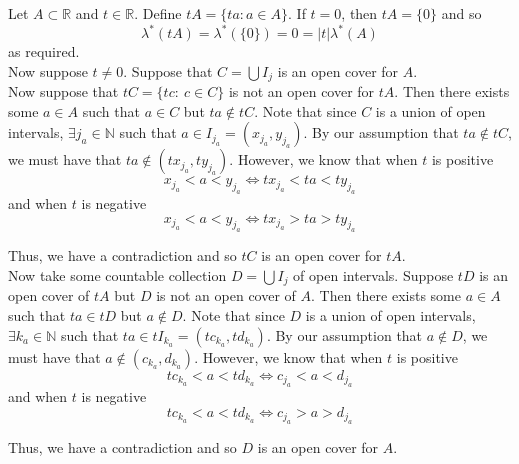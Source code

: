 \documentclass[12pt]{article}
\newenvironment{problem}[2][Problem]{\begin{trivlist}
\item[\hskip \labelsep {\bfseries #1}\hskip \labelsep {\bfseries #2.}]}{\end{trivlist}}
\begin{document}
\begin{problem}{8}
\end{problem}

Let $A \subset \mathbb{R}$ and $t \in \mathbb{R}$. Define $tA = \{ta: a \in A\}$. If $t = 0$, then $tA = \{0\}$ and so $$\lambda^*(tA) = \lambda^*(\{0\}) = 0 = |t|\lambda^*(A)$$ as required.\\

Now suppose $t \neq 0$. Suppose that $C = \bigcup I_j$ is an open cover for $A$.\\

Now suppose that $tC = \{tc: \ c \in C\}$ is not an open cover for $tA$. Then there exists some $a \in A$ such that $a \in C$ but $ta \not\in tC$. Note that since $C$ is a union of open intervals, $\exists j_a \in \mathbb{N}$ such that $a \in I_{j_a} = (x_{j_a}, y_{j_a})$. By our assumption that $ta \not\in tC$, we must have that $ta \not\in (tx_{j_a}, ty_{j_a} )$. However, we know that when $t$ is positive $$x_{j_a} < a < y_{j_a} \iff tx_{j_a} < ta < ty_{j_a}$$ and when $t$ is negative $$x_{j_a} < a < y_{j_a} \iff tx_{j_a} > ta > ty_{j_a}$$

Thus, we have a contradiction and so $tC$ is an open cover for $tA$.\\

Now take some countable collection $D = \bigcup I_j$ of open intervals. Suppose $tD$ is an open cover of $tA$ but $D$ is not an open cover of $A$. Then there exists some $a \in A$ such that $ta \in tD$ but $a \not\in D$. Note that since $D$ is a union of open intervals, $\exists k_a \in \mathbb{N}$ such that $ta \in tI_{k_a} = (tc_{k_a}, td_{k_a})$. By our assumption that $a \not\in D$, we must have that $a \not\in (c_{k_a}, d_{k_a})$. However, we know that when $t$ is positive $$tc_{k_a} < a < td_{k_a} \iff c_{j_a} < a < d_{j_a}$$ and when $t$ is negative $$tc_{k_a} < a < td_{k_a} \iff c_{j_a} > a > d_{j_a}$$
 
Thus, we have a contradiction and so $D$ is an open cover for $A$.\\
\end{document}
